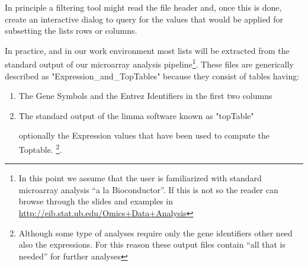 \documentclass{article}\usepackage[]{graphicx}\usepackage[]{color}
\begin{document}
In principle a filtering tool might read the file header and, once this is done, create an interactive dialog to query for the values that would be applied for subsetting the lists rows or columns.

In practice, and in our work environment most lists will be extracted from the standard output of our microarray analysis pipeline\footnote{In this point we assume that the user is familiarized with standard microarray analysis ``a la Bioconductor''. If this is not so the reader can browse through the slides and examples in \url{http://eib.stat.ub.edu/Omics+Data+Analysis}}. These files are generically described as "Expression_and_TopTables" because they consist of tables having:
\begin{enumerate}
\item The Gene Symbols and the Entrez Identifiers in the first two columns
\item The standard output of the limma software known as "topTable"
\item [optionally] the Expression values that have been used to compute the Toptable. \footnote{Although some type of analyses require only the gene identifiers other need also the expressions. For this reason these output files contain ``all that is needed'' for further analyses}.
\end{enumerate}
\end{document}
